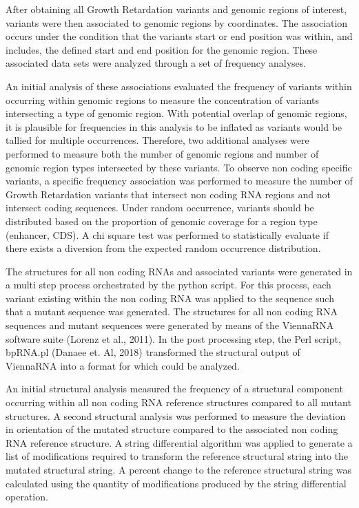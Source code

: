 \documentclass[11pt]{article}
\begin{document}
After obtaining all Growth Retardation variants and genomic regions of interest, variants were then associated to genomic regions by coordinates. The association occurs under the condition that the variants start or end position was within, and includes, the defined start and end position for the genomic region. These associated data sets were analyzed through a set of frequency analyses. 

An initial analysis of these associations evaluated the frequency of variants within occurring within genomic regions to measure the concentration of variants intersecting a type of genomic region. With potential overlap of genomic regions, it is plausible for frequencies in this analysis to be inflated as variants would be tallied for multiple occurrences. Therefore, two additional analyses were performed to measure both the number of genomic regions and number of genomic region types intersected by these variants. To observe non coding specific variants, a specific frequency association was performed to measure the number of Growth Retardation variants that intersect non coding RNA regions and not intersect coding sequences. Under random occurrence, variants should be distributed based on the proportion of genomic coverage for a region type (enhancer, CDS). A chi square test was performed to statistically evaluate if there exists a diversion from the expected random occurrence distribution.  

The structures for all non coding RNAs and associated variants were generated in a multi step process orchestrated by the python script. For this process, each variant existing within the non coding RNA was applied to the sequence such that a mutant sequence was generated. The structures for all non coding RNA sequences and mutant sequences were generated by means of the ViennaRNA software suite (Lorenz et al., 2011). In the post processing step, the Perl script, bpRNA.pl (Danaee et. Al, 2018) transformed the structural output of ViennaRNA into a format for which could be analyzed.  

An initial structural analysis measured the frequency of a structural component occurring within all non coding RNA reference structures compared to all mutant structures. A second structural analysis was performed to measure the deviation in orientation of the mutated structure compared to the associated non coding RNA reference structure. A string differential algorithm was applied to generate a list of modifications required to transform the reference structural string into the mutated structural string. A percent change to the reference structural string was calculated using the quantity of modifications produced by the string differential operation.  
\end{document}
